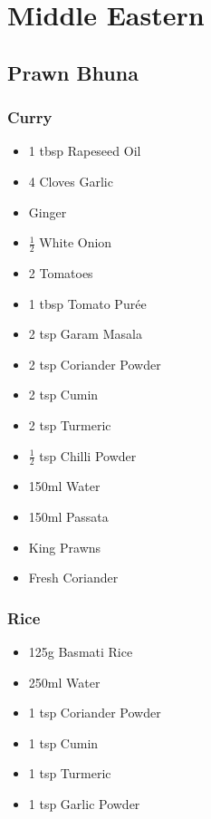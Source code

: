 \documentclass[11pt, english]{article}
\begin{document}
\newpage

\section{Middle Eastern}

	\subsection{Prawn Bhuna}

		\subsubsection*{Curry}

	\begin{itemize}
        \setlength\itemsep{0cm}
                \item 1 tbsp Rapeseed Oil
		\item 4 Cloves Garlic
		\item Ginger
		\item $\frac{1}{2}$ White Onion
		\item 2 Tomatoes
		\item 1 tbsp Tomato Pur\'{e}e
		\item 2 tsp Garam Masala
		\item 2 tsp Coriander Powder
		\item 2 tsp Cumin
		\item 2 tsp Turmeric
		\item $\frac{1}{2}$ tsp Chilli Powder
		\item 150ml Water
		\item 150ml Passata
		\item King Prawns
		\item Fresh Coriander
        \end{itemize}

		\subsubsection*{Rice}

	\begin{itemize}
	\setlength\itemsep{0cm}
		\item 125g Basmati Rice
		\item 250ml Water
		\item 1 tsp Coriander Powder
		\item 1 tsp Cumin
		\item 1 tsp Turmeric
		\item 1 tsp Garlic Powder
	\end{itemize}
\end{document}
